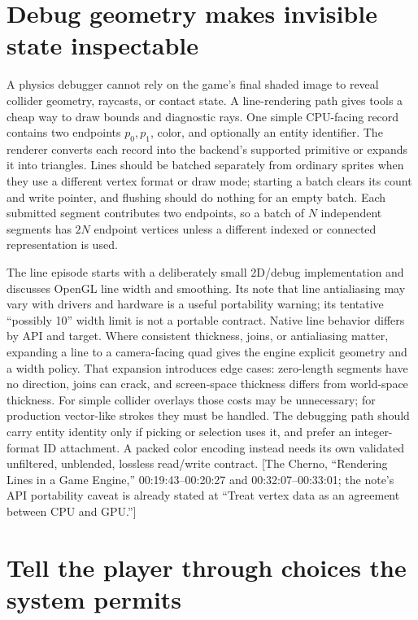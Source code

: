 \section{Debug geometry makes invisible state inspectable}\label{06-engine-ii-ch047-debug-geometry-makes-invisible-state-inspectable}

A physics debugger cannot rely on the game's final shaded image to reveal collider geometry, raycasts, or contact state. A line-rendering path gives tools a cheap way to draw bounds and diagnostic rays. One simple CPU-facing record contains two endpoints \(p_0,p_1\), color, and optionally an entity identifier. The renderer converts each record into the backend's supported primitive or expands it into triangles. Lines should be batched separately from ordinary sprites when they use a different vertex format or draw mode; starting a batch clears its count and write pointer, and flushing should do nothing for an empty batch. Each submitted segment contributes two endpoints, so a batch of \(N\) independent segments has \(2N\) endpoint vertices unless a different indexed or connected representation is used.

The line episode starts with a deliberately small 2D/debug implementation and discusses OpenGL line width and smoothing. Its note that line antialiasing may vary with drivers and hardware is a useful portability warning; its tentative ``possibly 10'' width limit is not a portable contract. Native line behavior differs by API and target. Where consistent thickness, joins, or antialiasing matter, expanding a line to a camera-facing quad gives the engine explicit geometry and a width policy. That expansion introduces edge cases: zero-length segments have no direction, joins can crack, and screen-space thickness differs from world-space thickness. For simple collider overlays those costs may be unnecessary; for production vector-like strokes they must be handled. The debugging path should carry entity identity only if picking or selection uses it, and prefer an integer-format ID attachment. A packed color encoding instead needs its own validated unfiltered, unblended, lossless read/write contract. {[}The Cherno, ``Rendering Lines in a Game Engine,'' 00:19:43--00:20:27 and 00:32:07--00:33:01; the note's API portability caveat is already stated at ``Treat vertex data as an agreement between CPU and GPU.''{]}

\section{Tell the player through choices the system permits}\label{06-engine-ii-ch047-tell-the-player-through-choices-the-system-permits}

